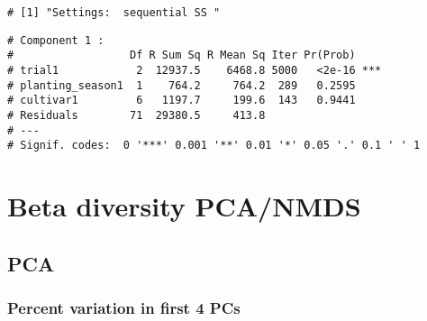 \documentclass[
]{article}
\newenvironment{Shaded}{\begin{snugshade}}{\end{snugshade}}
\newcommand{\AttributeTok}[1]{\textcolor[rgb]{0.77,0.63,0.00}{#1}}
\newcommand{\CommentTok}[1]{\textcolor[rgb]{0.56,0.35,0.01}{\textit{#1}}}
\newcommand{\DecValTok}[1]{\textcolor[rgb]{0.00,0.00,0.81}{#1}}
\newcommand{\FunctionTok}[1]{\textcolor[rgb]{0.00,0.00,0.00}{#1}}
\newcommand{\NormalTok}[1]{#1}
\newcommand{\OtherTok}[1]{\textcolor[rgb]{0.56,0.35,0.01}{#1}}
\newcommand{\SpecialCharTok}[1]{\textcolor[rgb]{0.00,0.00,0.00}{#1}}
\newcommand{\StringTok}[1]{\textcolor[rgb]{0.31,0.60,0.02}{#1}}
\begin{document}
\begin{verbatim}
# [1] "Settings:  sequential SS "
\end{verbatim}

\begin{verbatim}
# Component 1 :
#                  Df R Sum Sq R Mean Sq Iter Pr(Prob)    
# trial1            2  12937.5    6468.8 5000   <2e-16 ***
# planting_season1  1    764.2     764.2  289   0.2595    
# cultivar1         6   1197.7     199.6  143   0.9441    
# Residuals        71  29380.5     413.8                  
# ---
# Signif. codes:  0 '***' 0.001 '**' 0.01 '*' 0.05 '.' 0.1 ' ' 1
\end{verbatim}

\hypertarget{beta-diversity-pcanmds}{%
\section{Beta diversity PCA/NMDS}\label{beta-diversity-pcanmds}}

\hypertarget{pca}{%
\subsection{PCA}\label{pca}}

\begin{Shaded}
\end{Shaded}

\hypertarget{percent-variation-in-first-4-pcs}{%
\subsubsection{Percent variation in first 4
PCs}\label{percent-variation-in-first-4-pcs}}

\begin{Shaded}
\end{Shaded}
\end{document}
